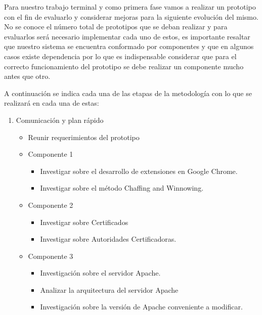 \documentclass[12pt, a4paper, titlepage]{report}
\begin{document}
    		Para nuestro trabajo terminal y como primera fase vamos a realizar un prototipo con el fin de evaluarlo y considerar mejoras para la siguiente evolución del mismo. No se conoce el número total de prototipos que se deban realizar y para evaluarlos será necesario implementar cada uno de estos, es importante resaltar que nuestro sistema se encuentra conformado por componentes y que en algunos casos existe dependencia por lo que es indispensable considerar que para el correcto funcionamiento del prototipo se debe realizar un componente mucho antes que otro.
    		
    		A continuación se indica cada una de las etapas de la metodología con lo que se realizar\'a en cada una de estas: 
    		\begin{enumerate}
    		    \item Comunicaci\'on y plan r\'apido
    		        \begin{itemize}
    		            \item Reunir requerimientos del prototipo
    		            \item Componente 1
        		            \begin{itemize}
        		                \item Investigar sobre el desarrollo de extensiones en Google Chrome.
                		        \item Investigar sobre el método Chaffing and Winnowing.
        		            \end{itemize}
        		        \item Componente 2
        		            \begin{itemize}
        		                \item Investigar sobre Certificados
        		                \item Investigar sobre Autoridades Certificadoras.
        		            \end{itemize}
        		        \item Componente 3
        		            \begin{itemize}
        		                \item Investigación sobre el servidor Apache.
                                \item Analizar la arquitectura del servidor Apache
                                \item Investigación sobre la versión de Apache conveniente a modificar.
        		            \end{itemize}

\end{itemize}
\end{enumerate}
\end{document}
